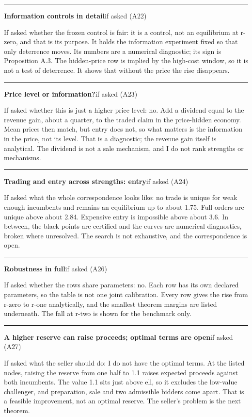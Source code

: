 \documentclass[11pt]{article}
\newcommand{\scriptframe}[3]{%
  \Needspace{9\baselineskip}%
  \par\medskip\noindent\textcolor{ScriptBlue}{\rule{\linewidth}{0.55pt}}%
  \par\smallskip\noindent
  \textbf{#1}\hfill\textcolor{ScriptGray}{\small #2}\par\smallskip
  #3\par}
\begin{document}
\scriptframe{Information controls in detail}{if asked (A22)}{%
  If asked whether the frozen control is fair: it is a control, not an
  equilibrium at r-zero, and that is its purpose. It holds the information
  experiment fixed so that only deterrence moves. Its numbers are a numerical
  diagnostic; its sign is Proposition A.3. The hidden-price row is implied by
  the high-cost window, so it is not a test of deterrence. It shows that without
  the price the rise disappears.
}

\scriptframe{Price level or information?}{if asked (A23)}{%
  If asked whether this is just a higher price level: no. Add a dividend equal
  to the revenue gain, about a quarter, to the traded claim in the price-hidden
  economy. Mean prices then match, but entry does not, so what matters is the
  information in the price, not its level. That is a diagnostic; the revenue
  gain itself is analytical. The dividend is not a sale mechanism, and I do not
  rank strengths or mechanisms.
}

\scriptframe{Trading and entry across strengths: entry}{if asked (A24)}{%
  If asked what the whole correspondence looks like: no trade is unique for weak
  enough incumbents and remains an equilibrium up to about 1.75. Full orders are
  unique above about 2.84. Expensive entry is impossible above about 3.6. In
  between, the black points are certified and the curves are numerical
  diagnostics, broken where unresolved. The search is not exhaustive, and the
  correspondence is open.
}

\scriptframe{Robustness in full}{if asked (A26)}{%
  If asked whether the rows share parameters: no. Each row has its own declared
  parameters, so the table is not one joint calibration. Every row gives the
  rise from r-zero to r-one analytically, and the smallest theorem margins are
  listed underneath. The fall at r-two is shown for the benchmark only.
}

\scriptframe{A higher reserve can raise proceeds; optimal terms are open}{if asked (A27)}{%
  If asked what the seller should do: I do not have the optimal terms. At the
  listed nodes, raising the reserve from one half to 1.1 raises expected
  proceeds against both incumbents.
  The value 1.1 sits just above ell, so it excludes the low-value challenger,
  and preparation, sale and two admissible bidders come apart. That is a
  feasible improvement, not an optimal reserve. The seller's problem is the next
  theorem.
}
\end{document}
